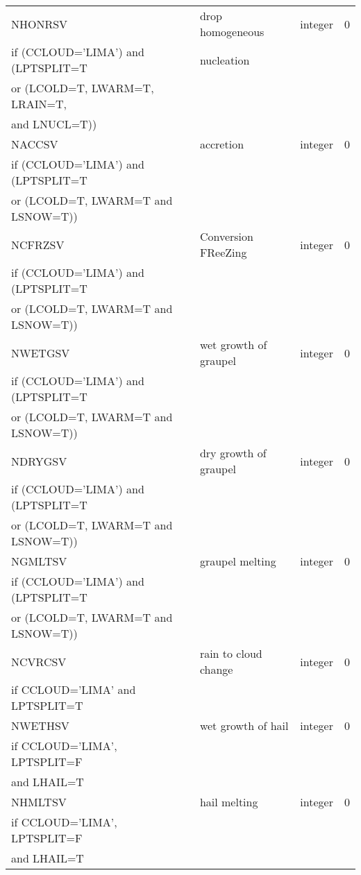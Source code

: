 \begin{longtable} {|p{}|p{}|>{\centering}p{}|p{}<{\centering}|}
NHONRSV & drop homogeneous  & integer & 0 \\ \nopagebreak
if (CCLOUD='LIMA') and (LPTSPLIT=T & nucleation && \\ \nopagebreak
or (LCOLD=T, LWARM=T, LRAIN=T, &&& \\ \nopagebreak
and LNUCL=T))&&& \\\hline

NACCSV & accretion & integer & 0 \\ \nopagebreak
if (CCLOUD='LIMA') and (LPTSPLIT=T &&& \\ \nopagebreak
or (LCOLD=T, LWARM=T and LSNOW=T))&&& \\\hline

NCFRZSV & Conversion FReeZing & integer & 0 \\ \nopagebreak
if (CCLOUD='LIMA') and (LPTSPLIT=T &&& \\ \nopagebreak
or (LCOLD=T, LWARM=T and LSNOW=T))&&& \\\hline

NWETGSV & wet growth of graupel & integer & 0 \\ \nopagebreak
if (CCLOUD='LIMA') and (LPTSPLIT=T &&& \\ \nopagebreak
or (LCOLD=T, LWARM=T and LSNOW=T))&&& \\\hline

NDRYGSV & dry growth of graupel & integer & 0 \\ \nopagebreak
if (CCLOUD='LIMA') and (LPTSPLIT=T &&& \\ \nopagebreak
or (LCOLD=T, LWARM=T and LSNOW=T))&&& \\\hline

NGMLTSV & graupel melting& integer & 0 \\ \nopagebreak
if (CCLOUD='LIMA') and (LPTSPLIT=T &&& \\ \nopagebreak
or (LCOLD=T, LWARM=T and LSNOW=T))&&& \\\hline

NCVRCSV & rain to cloud change & integer & 0 \\ \nopagebreak
if CCLOUD='LIMA' and LPTSPLIT=T &&& \\\hline

NWETHSV & wet growth of hail& integer & 0 \\ \nopagebreak
if CCLOUD='LIMA', LPTSPLIT=F &&& \\ \nopagebreak
and LHAIL=T &&& \\\hline

NHMLTSV & hail melting & integer & 0 \\ \nopagebreak
if CCLOUD='LIMA', LPTSPLIT=F &&& \\ \nopagebreak
and LHAIL=T &&& \\\hline


\end{longtable}
